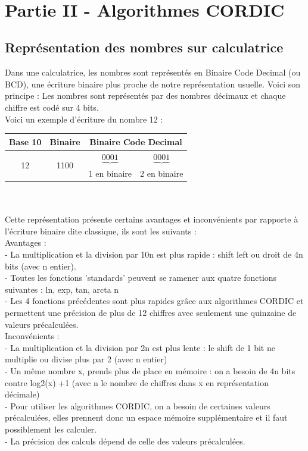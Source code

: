 \documentclass{article}
\begin{document}
\vspace{3em} \

\section*{Partie II - Algorithmes CORDIC}

\subsection*{Représentation des nombres sur calculatrice}

Dans une calculatrice, les nombres sont représentés en Binaire Code Decimal (ou BCD), une écriture binaire plus proche de notre représentation usuelle. Voici son principe : Les nombres sont représentés par des nombres décimaux et chaque chiffre est codé sur 4 bits. \\

Voici un exemple d'écriture du nombre 12 : \\

\begin{tabular}{ c | c | c c }
   Base 10 & Binaire &   \multicolumn{2}{c}{Binaire Code Decimal}\\ \hline
    \multirow{2}{*}{12} & \multirow{2}{*}{1100} & $\underbrace{0001}$ & $\underbrace{0001}$ \\
    & & 1 en binaire & 2 en binaire \\
 \end{tabular} \\ \\ 

Cette représentation présente certains avantages et inconvénients par rapporte à l'écriture binaire dite classique, ils sont les suivants : \\

Avantages :\\
- La multiplication et la division par 10n est plus rapide : shift left ou droit de 4n bits (avec n entier).\\
- Toutes les fonctions 'standards' peuvent se ramener aux quatre fonctions suivantes :  ln, exp, tan, arcta n\\
- Les 4 fonctions précédentes sont plus rapides grâce aux algorithmes CORDIC et permettent une précision de plus de 12 chiffres avec seulement une quinzaine de valeurs précalculées.\\

Inconvénients :\\
- La multiplication et la division par 2n est plus lente : le shift de 1 bit ne multiplie ou divise plus par 2 (avec n entier)\\
- Un même nombre x, prends plus de place en mémoire : on a besoin de 4n bits contre log2(x) +1 (avec n le nombre de chiffres dans x en représentation décimale)\\
- Pour utiliser les algorithmes CORDIC, on a besoin de certaines valeurs précalculées, elles prennent donc un espace mémoire supplémentaire et il faut possiblement les calculer.\\
- La précision des calculs dépend de celle des valeurs précalculées.
\end{document}

